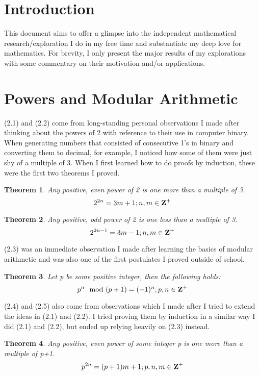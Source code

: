 \documentclass{article}
\newtheorem{theorem}{Theorem}[section]
\begin{document}
\section{Introduction}
This document aims to offer a glimpse into the independent mathematical research/exploration I do in my free time and substantiate my deep love for mathematics. For brevity, I only present the major results of my explorations with some commentary on their motivation and/or applications.

\section{Powers and Modular Arithmetic}

(2.1) and (2.2) come from long-standing personal observations I made after thinking about the powers of 2 with reference to their use in computer binary. When generating numbers that consisted of consecutive 1's in binary and converting them to decimal, for example, I noticed how some of them were just shy of a multiple of 3. When I first learned how to do proofs by induction, these were the first two theorems I proved.

\begin{theorem}
    Any positive, even power of 2 is one more than a multiple of 3. 
    $$2^{2n}=3m+1;n,m\in\mbox{\textbf{Z}}^+$$
\end{theorem}

\begin{theorem}
    Any positive, odd power of 2 is one less than a multiple of 3. 
    $$2^{2n-1}=3m-1;n,m\in\mbox{\textbf{Z}}^+$$
\end{theorem}

(2.3) was an immediate observation I made after learning the basics of modular arithmetic and was also one of the first postulates I proved outside of school.

\begin{theorem}
    Let \mbox{p} be some positive integer, then the following holds:
    $$p^n\mod{(p+1)}=(-1)^n;p,n\in\mbox{\textbf{Z}}^+$$
\end{theorem}

(2.4) and (2.5) also come from observations which I made after I tried to extend the ideas in (2.1) and (2.2). I tried proving them by induction in a similar way I did (2.1) and (2.2), but ended up relying heavily on (2.3) instead.

\begin{theorem}
    Any positive, even power of some integer \mbox{p} is one more than a multiple of \mbox{p+1}. 
    $$p^{2n}=(p+1)m+1;p,n,m\in\mbox{\textbf{Z}}^+$$
\end{theorem}
\end{document}
